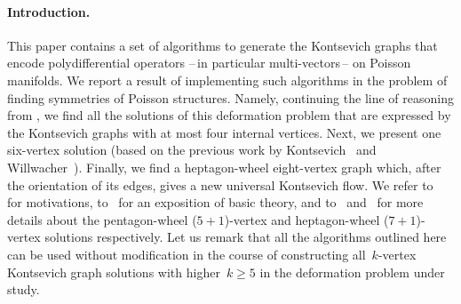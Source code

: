 \documentclass[a4paper]{jpconf}%
\theoremstyle{definition}
\theoremstyle{remark}
\begin{document}
\paragraph{\textbf{\textup{Introduction.}}}
This paper contains a set of algorithms to generate the Kontsevich graphs 
that encode polydifferential operators --\,in particular multi\/-\/vectors\,-- on Poisson manifolds.
We report a result of implementing such algorithms in the problem of 
fin\-ding symmetries %
of Poisson structures.
Namely, continuing the line of reasoning from %
\cite{tetra16,f16}, we find all the solutions of this deformation problem that are expressed by the Kontsevich graphs with at most four internal vertices. Next, we present %
one six\/-\/vertex solution (based on the previous work by Kontsevich~\cite{Kontsevich2017private} 
and %
Willwacher~\cite{Willwacher2017private}).
Finally, we find a heptagon\/-\/wheel eight\/-\/vertex graph %
which, after the orientation of its edges, gives %
a new universal Kontsevich flow.
We refer to~\cite{Ascona96, Kontsevich2017Bourbaki} for motivations, to~\cite{f16,cpp} for an exposition
of basic theory, and to~\cite{WeFactorize5Wheel} and~\cite{JNMP2017} for more details about the pentagon\/-\/wheel ($5+1$)-\/vertex and heptagon\/-\/wheel ($7+1$)-\/vertex
solutions respectively.
Let us remark that all the algorithms outlined here can be used without %
modification in the course of constructing all~$k$-\/vertex Kontsevich graph solutions 
with higher~$k \geqslant 5$ in the deformation problem under study.

\end{document}
